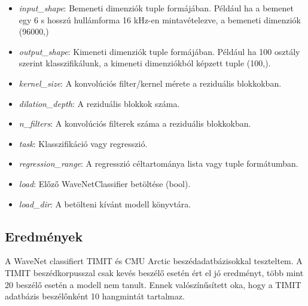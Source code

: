 \begin{itemize}
	\item \emph{input\_shape}: Bemeneti dimenziók tuple formájában. Például ha a bemenet egy 6 s hosszú hullámforma 16 kHz-en mintavételezve, a bemeneti dimenziók (96000,)
	\item \emph{output\_shape}: Kimeneti dimenziók tuple formájában. Például ha 100 osztály szerint klasszifikálunk, a kimeneti dimenziókból képzett tuple (100,).
	\item \emph{kernel\_size}: A konvolúciós filter/kernel mérete a reziduális blokkokban.
	\item \emph{dilation\_depth}: A reziduális blokkok száma.
	\item \emph{n\_filters}: A konvolúciós filterek száma a reziduális blokkokban.
	\item \emph{task}: Klasszifikáció vagy regresszió.
	\item \emph{regression\_range}: A regresszió céltartománya lista vagy tuple formátumban.
	\item \emph{load}: Előző WaveNetClassifier betöltése (bool).
	\item \emph{load\_dir}: A betölteni kívánt modell könyvtára.
\end{itemize}

\subsection{Eredmények}

A WaveNet classifiert TIMIT és CMU Arctic beszédadatbázisokkal teszteltem. A TIMIT beszédkorpusszal csak kevés beszélő esetén ért el jó eredményt, több mint 20 beszélő esetén a modell nem tanult. Ennek valószínűsített oka, hogy a TIMIT adatbázis beszélőnként 10 hangmintát tartalmaz.

\setlength\arrayrulewidth{0.6pt}

